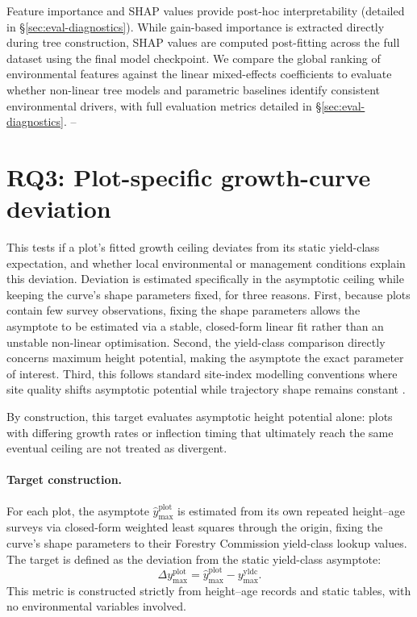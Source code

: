 Feature importance and SHAP values provide post-hoc interpretability (detailed in \S\ref{sec:eval-diagnostics}). While gain-based importance is extracted directly during tree construction, SHAP values are computed post-fitting across the full dataset using the final model checkpoint. We compare the global ranking of environmental features against the linear mixed-effects coefficients to evaluate whether non-linear tree models and parametric baselines identify consistent environmental drivers, with full evaluation metrics detailed in \S\ref{sec:eval-diagnostics}. -- %

\section{RQ3: Plot-specific growth-curve deviation}
This tests if a plot's fitted growth ceiling deviates from its static yield-class expectation, and whether local environmental or management conditions explain this deviation. Deviation is estimated specifically in the asymptotic ceiling while keeping the curve's shape parameters fixed, for three reasons. First, because plots contain few survey observations, fixing the shape parameters allows the asymptote to be estimated via a stable, closed-form linear fit rather than an unstable non-linear optimisation. Second, the yield-class comparison directly concerns maximum height potential, making the asymptote the exact parameter of interest. Third, this follows standard site-index modelling conventions where site quality shifts asymptotic potential while trajectory shape remains constant \citep{socha2021Regional_C2_CR}. 

By construction, this target evaluates asymptotic height potential alone: plots with differing growth rates or inflection timing that ultimately reach the same eventual ceiling are not treated as divergent. 

\paragraph*{Target construction.}
For each plot, the asymptote $\hat{y}_{\max}^{\text{plot}}$ is estimated from its own repeated height--age surveys via closed-form weighted least squares through the origin, fixing the curve's shape parameters to their Forestry Commission yield-class lookup values. The target is defined as the deviation from the static yield-class asymptote:
\begin{equation}
\Delta y_{\max}^{\text{plot}} = \hat y_{\max}^{\text{plot}} - y_{\max}^{\text{yldc}}.
\label{eq:local-ymax-diff}
\end{equation}
This metric is constructed strictly from height--age records and static tables, with no environmental variables involved. 

